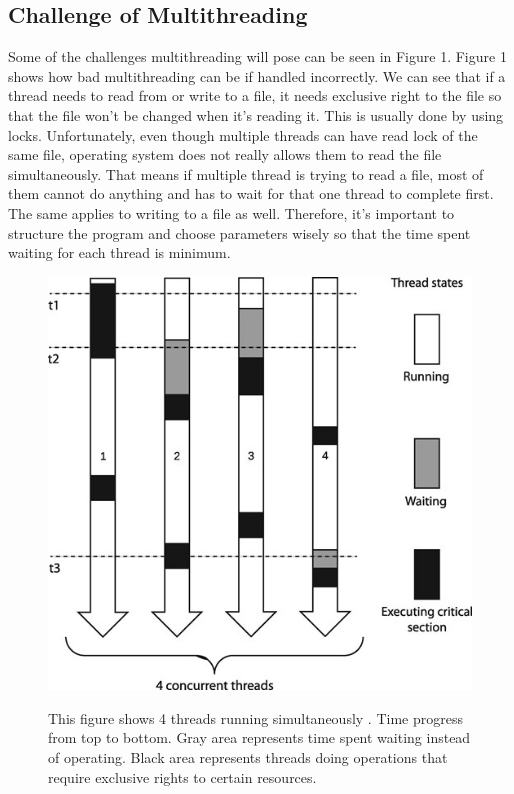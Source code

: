 \subsection{Challenge of Multithreading}
Some of the challenges multithreading will pose can be seen in Figure 1. Figure 1 shows how bad multithreading can be if handled incorrectly. We can see that if a thread needs to read from or write to a file, it needs exclusive right to the file so that the file won't be changed when it's reading it. This is usually done by using locks. Unfortunately, even though multiple threads can have read lock of the same file, operating system does not really allows them to read the file simultaneously. That means if multiple thread is trying to read a file, most of them cannot do anything and has to wait for that one thread to complete first. The same applies to writing to a file as well. Therefore, it's important to structure the program and choose parameters wisely so that the time spent waiting for each thread is minimum. 
\begin{figure}[H]
    \includegraphics[width=\linewidth]{figs/multithread.jpeg}
    \label{fig:multithread}
    \caption{This figure shows 4 threads running simultaneously . Time progress from top to bottom. Gray area represents time spent waiting instead of operating. Black area represents threads doing operations that require exclusive rights to certain resources. ~\cite{intropaper}}
\end{figure}

